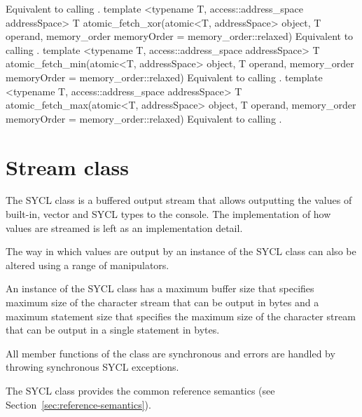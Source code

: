     {
      Equivalent to calling .
    }
  \addRowThreeSL
    { template <typename T, access::address_space addressSpace> }
    { T atomic_fetch_xor(atomic<T, addressSpace> object, T operand, }
    { memory_order memoryOrder = memory_order::relaxed) }
    {
      Equivalent to calling .
    }
  \addRowThreeSL
    { template <typename T, access::address_space addressSpace> }
    { T atomic_fetch_min(atomic<T, addressSpace> object, T operand, }
    { memory_order memoryOrder = memory_order::relaxed) }
    {
      Equivalent to calling .
    }
  \addRowThreeSL
    { template <typename T, access::address_space addressSpace> }
    { T atomic_fetch_max(atomic<T, addressSpace> object, T operand, }
    { memory_order memoryOrder = memory_order::relaxed) }
    {
      Equivalent to calling .
    }
\completeTable

\section{Stream class}
\label{subsection:stream}

The SYCL  class is a buffered output stream that allows outputting the values of built-in, vector and SYCL types to the console. The implementation of how values are streamed is left as an implementation detail.

The way in which values are output by an instance of the SYCL  class can also be altered using a range of manipulators.

An instance of the SYCL  class has a maximum buffer size that specifies maximum size of the character stream that can be output in bytes and a maximum statement size that specifies the maximum size of the character stream that can be output in a single statement in bytes.

All member functions of the  class are synchronous and errors are handled by throwing synchronous SYCL exceptions.

The SYCL  class provides the common reference semantics
(see Section~\ref{sec:reference-semantics}).

